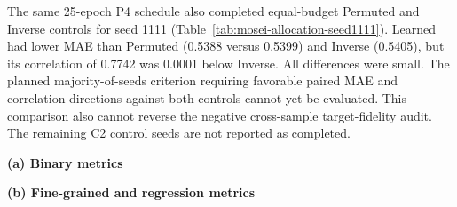 The same 25-epoch P4 schedule also completed equal-budget Permuted and Inverse
controls for seed 1111 (Table~\ref{tab:mosei-allocation-seed1111}). Learned
had lower MAE than Permuted (0.5388 versus 0.5399) and Inverse (0.5405),
but its correlation of 0.7742 was 0.0001 below Inverse. All differences
were small. The planned majority-of-seeds criterion requiring favorable
paired MAE and correlation directions against both controls cannot yet be
evaluated. This comparison also cannot reverse the negative
cross-sample target-fidelity audit. The remaining C2 control seeds are not
reported as completed.

\begin{table}[t]
\caption{Final-schedule CMU-MOSEI allocation controls on seed 1111 only.
All methods use the same mean auxiliary budget, frozen training schedule,
validation-loss checkpoint rule, and checkpoint-reloaded test protocol.
These are single-seed descriptive results, separate from the three-seed
Constant/Learned comparison.}
\label{tab:mosei-allocation-seed1111}
\centering
\small
\textbf{(a) Binary metrics}\par\smallskip
{}

\vspace{0.7em}
\textbf{(b) Fine-grained and regression metrics}\par\smallskip
{}
\end{table}

